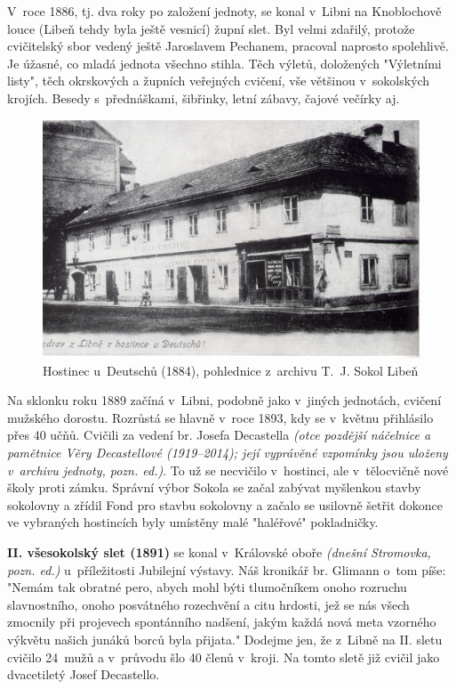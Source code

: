 \documentclass[a5paper, 11pt, twoside]{article}
\newcommand{\pozned}[1]{%
\textit{#1}}
\begin{document}
V~roce 1886, tj. dva roky po založení jednoty, se konal v~Libni na Knoblochově louce (Libeň tehdy byla ještě vesnicí) župní slet. Byl velmi zdařilý, protože cvičitelský sbor vedený ještě Jaroslavem Pechanem, pracoval naprosto spolehlivě. Je úžasné, co mladá jednota všechno stihla. Těch výletů, doložených "Výletními listy", těch okrskových a župních veřejných cvičení, vše většinou v~sokolských krojích. Besedy s~přednáškami, šibřinky, letní zábavy, čajové večírky aj.
\begin{figure}[h!]
  \centering
  \includegraphics[width=\textwidth]{img/09_hospoda_u_deutschu.jpg}
  \caption*{Hostinec u~Deutschů (1884), pohlednice z~archivu T.~J.
  Sokol Libeň}
\end{figure}

Na sklonku roku 1889 začíná v~Libni, podobně jako v~jiných jednotách, cvičení mužského dorostu. Rozrůstá se hlavně v~roce 1893, kdy se v~květnu přihlásilo přes 40 učňů. Cvičili za vedení br. Josefa Decastella \pozned{(otce pozdější náčelnice a pamětnice Věry Decastellové (1919–2014); její vyprávěné vzpomínky jsou uloženy v~archivu jednoty, pozn. ed.)}. To už se necvičilo v~hostinci, ale v~tělocvičně nové školy proti zámku. Správní výbor Sokola se začal zabývat myšlenkou stavby sokolovny a zřídil Fond pro stavbu sokolovny a začalo se usilovně šetřit dokonce ve vybraných hostincích byly umístěny malé "haléřové" pokladničky.

\textbf{II. všesokolský slet (1891)} se konal v~Královské oboře \pozned{(dnešní Stromovka, pozn. ed.)} u~příležitosti Jubilejní výstavy. Náš kronikář br. Glimann o~tom píše: "Nemám tak obratné pero, abych mohl býti tlumočníkem onoho rozruchu slavnostního, onoho posvátného rozechvění a citu hrdosti, jež se nás všech zmocnily při projevech spontánního nadšení, jakým každá nová meta vzorného výkvětu našich junáků borců byla přijata." Dodejme jen, že z~Libně na II. sletu cvičilo 24~mužů a v~průvodu šlo 40 členů v~kroji. Na tomto sletě již cvičil jako dvacetiletý Josef Decastello.
\end{document}
